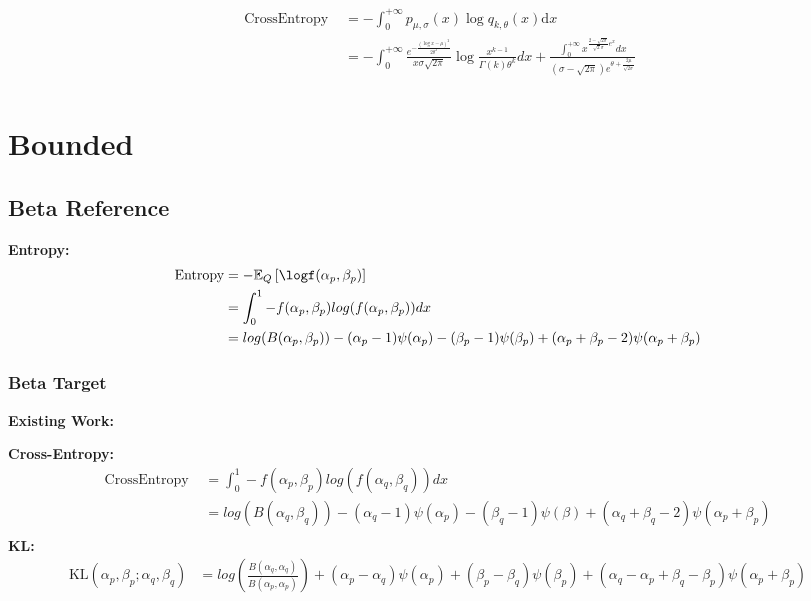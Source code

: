 \documentclass{article}
\begin{document}
$$ \begin{aligned} \text { CrossEntropy }&=-\int_{0}^{+\infty} p_{\mu,\sigma}(x) \log q_{k,\theta}(x) \mathrm{d} x \\
&=-\int_{0}^{+\infty } \frac{e^{-\frac{(\log{x}-\mu)^{2}}{2\theta^{2}} }}{x\sigma\sqrt{2\pi}} \log\frac{x^{k-1}}{\Gamma(k)\theta^{k}}dx+\frac{\int_{0}^{+\infty} x^{\frac{2-\sqrt{2\sigma}}{\sqrt2\sigma}e^{x} }dx }{(\sigma-\sqrt{2\pi})e^{\theta+\frac{2\mu}{\sqrt{2\sigma}}}} \\
\end{aligned} $$

\section{Bounded}

\subsection{Beta Reference}

\noindent \textbf{Entropy:}
$$ \begin{aligned} \text{Entropy}&=-\mathbb{E}_{Q}\left[\logf(\alpha_{p},\beta_{p})\right]\\&=\int_{0}^{1}-f(\alpha_{p},\beta_{p})log(f(\alpha_{p},\beta_{p}))dx\\&=log(B(\alpha_{p},\beta_{p}))-(\alpha_{p}-1)\psi(\alpha_{p})-(\beta_{p}-1)\psi(\beta_{p})+(\alpha_{p}+\beta_{p}-2)\psi(\alpha_{p}+\beta_{p})
\end{aligned} $$

\subsubsection{Beta Target}

\noindent \textbf{Existing Work:}

\noindent \textbf{Cross-Entropy:}
$$ \begin{aligned} \text {CrossEntropy }&=\int_{0}^{1}-f(\alpha_{p},\beta_{p})log(f(\alpha_{q},\beta_{q}))dx\\ &=log(B(\alpha_{q},\beta_{q}))-(\alpha_{q}-1)\psi(\alpha_{p})-(\beta_{q}-1)\psi(\beta)+(\alpha_{q}+\beta_{q}-2)\psi(\alpha_{p}+\beta_{p})\\
\end{aligned} $$
\noindent \textbf{KL:}
$$ \begin{aligned}
\mathrm{KL}\left(\alpha_{p}, \beta_{p} ; \alpha_{q}, \beta_{q}\right)&=
log(\frac{B(\alpha_{q},\alpha_{q})}{B(\alpha_{p},\alpha_{p})})+(\alpha_{p}-\alpha_{q})\psi(\alpha_{p})+(\beta_{p}-\beta_{q})\psi(\beta_{p})+(\alpha_{q}-\alpha_{p}+\beta_{q}-\beta_{p})\psi(\alpha_{p}+\beta_{p})
\end{aligned} $$
\end{document}
